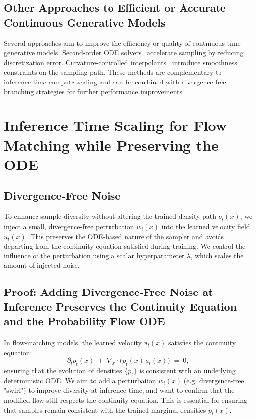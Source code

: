 \documentclass{article}
\begin{document}
\subsection{Other Approaches to Efficient or Accurate Continuous Generative Models}

Several approaches aim to improve the efficiency or quality of continuous-time generative models. Second-order ODE solvers~\cite{zhang2023secondorder} accelerate sampling by reducing discretization error. Curvature-controlled interpolants~\cite{dockhorn2023stochastic} introduce smoothness constraints on the sampling path. These methods are complementary to inference-time compute scaling and can be combined with divergence-free branching strategies for further performance improvements.

\section{Inference Time Scaling for Flow Matching while Preserving the ODE}
\subsection{Divergence-Free Noise}

To enhance sample diversity without altering the trained density path \(p_t(x)\), we inject a small, divergence-free perturbation \(w_t(x)\) into the learned velocity field \(u_t(x)\). This preserves the ODE-based nature of the sampler and avoids departing from the continuity equation satisfied during training. We control the influence of the perturbation using a scalar hyperparameter \(\lambda\), which scales the amount of injected noise.

\subsection{Proof: Adding Divergence-Free Noise at Inference Preserves the Continuity Equation and the Probability Flow ODE}

\paragraph{}  
In flow-matching models, the learned velocity \(u_t(x)\) satisfies the continuity equation:
\[
\partial_t p_t(x)\;+\;\nabla_x\!\cdot\!\bigl(p_t(x)\,u_t(x)\bigr)\;=\;0,
\tag{CE}
\]
ensuring that the evolution of densities \(\{p_t\}\) is consistent with an underlying deterministic ODE.  
We aim to add a perturbation \(w_t(x)\) (e.g. divergence-free "swirl") to improve diversity at inference time, and want to confirm that the modified flow still respects the continuity equation. This is essential for ensuring that samples remain consistent with the trained marginal densities \(p_t(x)\).
\end{document}
